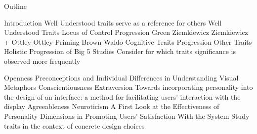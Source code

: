 \documentclass{article}
\begin{document}
Outline
\begin{outline}
    \1 Introduction
        \2 Well Understood traits serve as a reference
        for others
    \1 Well Understood Traits
        \2 Locus of Control Progression
            \3 Green
            \3 Ziemkiewicz
            \3 Ziemkiewicz + Ottley
            \3 Ottley Priming
            \3 Brown Waldo
        \2 Cognitive Traits Progression
    \1 Other Traits 
        \2 Holistic Progression of Big 5 Studies
            \3 Consider for which traits significance
            is observed more frequently

        \2 Openness
            \3 Preconceptions and Individual Differences
            in Understanding Visual Metaphors
        \2 Conscientiousness
        \2 Extraversion 
            \3 Towards incorporating personality into
            the design of an interface: a method for facilitating
            users’ interaction with the display 
        \2 Agreeableness 
        \2 Neuroticism
            \3 A First Look at the Effectiveness of Personality
            Dimensions in Promoting Users’ Satisfaction With the
            System
                \4 Study traits in the context of concrete
                design choices
\end{outline}
\end{document}

